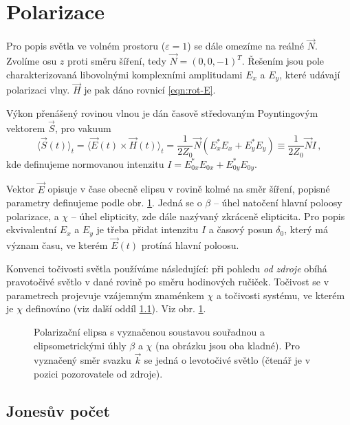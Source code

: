 \section{Polarizace}
\label{chap:polarizace}

Pro popis světla ve volném prostoru ($\varepsilon=1$) se dále omezíme na reálné $\vec{N}$.
Zvolíme osu $z$ proti směru šíření, tedy $\vec{N}=(0,0,-1)^T$.
Řešením jsou pole charakterizovaná libovolnými komplexními amplitudami $E_x$ a $E_y$, které udávají polarizaci vlny.
$\vec{H}$ je pak dáno rovnicí \eqref{eqn:rot-E}.

Výkon přenášený rovinou vlnou je dán časově středovaným Poyntingovým vektorem $\vec{S}$, pro vakuum\cite{bornPrinciplesOpticsElectromagnetic1999}
\begin{equation} \label{eqn:Poynting}
    \langle \vec{S}(t)\rangle_t=\langle\vec{E}(t)\times\vec{H}(t)\rangle_t=\frac{1}{2 Z_0}\vec{N} \left( E_x^*E_x+E_y^*E_y \right)
    \equiv \frac{1}{2 Z_0}\vec{N} I\,,
\end{equation}
kde definujeme normovanou intenzitu $I=E_{0x}^*E_{0x}+E_{0y}^*E_{0y}$.

Vektor $\vec{E}$ opisuje v čase obecně elipsu v rovině kolmé na směr šíření, popisné parametry definujeme podle obr. \ref{fig:polarizacni-elipsa}.
Jedná se o $\beta$ -- úhel natočení hlavní poloosy polarizace, a $\chi$ -- úhel elipticity, zde dále nazývaný zkráceně elipticita.
Pro popis ekvivalentní $E_x$ a $E_y$ je třeba přidat intenzitu $I$ a časový posun $\delta_0$, který má význam času, ve kterém $\vec{E}(t)$ protíná hlavní poloosu.

Konvenci točivosti světla používáme následující: při pohledu \emph{od zdroje} obíhá pravotočivé světlo v dané rovině po směru hodinových ručiček.
Točivost se v parametrech projevuje vzájemným znaménkem $\chi$ a točivosti systému, ve kterém je $\chi$ definováno (viz další oddíl \ref{chap:Jones}).
Viz obr. \ref{fig:polarizacni-elipsa}.

\begin{figure}[htbp]
    \centering
    
    \caption{Polarizační elipsa s vyznačenou soustavou souřadnou a elipsometrickými úhly $\beta$ a $\chi$ (na obrázku jsou oba kladné).
    Pro vyznačený směr svazku $\vec{k}$ se jedná o levotočivé světlo (čtenář je v pozici pozorovatele od zdroje).}
    \label{fig:polarizacni-elipsa}
\end{figure}

\subsection{Jonesův počet}
\label{chap:Jones}

